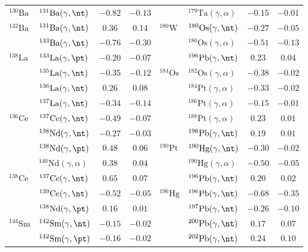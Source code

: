 {\begin{longtable}{llcc llcc}
$^{130}\mathrm{Ba}$ & $^{131}\mathrm{Ba}(\gamma,\nt)$ & $-0.82$ & $-0.13$ & $ $ & $^{179}\mathrm{Ta}(\gamma,\alpha)$ & $-0.15$ & $-0.01$ \\ 
$^{132}\mathrm{Ba}$ & $^{131}\mathrm{Ba}(\gamma,\nt)$ & $0.36$ & $0.14$ & $^{180}\mathrm{W}$ & $^{180}\mathrm{Os}(\gamma,\nt)$ & $-0.27$ & $-0.05$ \\ 
$ $ & $^{133}\mathrm{Ba}(\gamma,\nt)$ & $-0.76$ & $-0.30$ & $ $ & $^{180}\mathrm{Os}(\gamma,\alpha)$ & $-0.51$ & $-0.13$ \\ 
$^{138}\mathrm{La}$ & $^{133}\mathrm{La}(\gamma,\pt)$ & $-0.20$ & $-0.07$ & $ $ & $^{196}\mathrm{Pb}(\gamma,\nt)$ & $0.23$ & $0.04$ \\ 
$ $ & $^{135}\mathrm{La}(\gamma,\nt)$ & $-0.35$ & $-0.12$ & $^{184}\mathrm{Os}$ & $^{182}\mathrm{Os}(\gamma,\alpha)$ & $-0.38$ & $-0.02$ \\ 
$ $ & $^{136}\mathrm{La}(\gamma,\nt)$ & $0.26$ & $0.08$ & $ $ & $^{184}\mathrm{Pt}(\gamma,\alpha)$ & $-0.33$ & $-0.02$ \\ 
$ $ & $^{137}\mathrm{La}(\gamma,\nt)$ & $-0.34$ & $-0.14$ & $ $ & $^{186}\mathrm{Pt}(\gamma,\alpha)$ & $-0.15$ & $-0.01$ \\ 
$^{136}\mathrm{Ce}$ & $^{137}\mathrm{Ce}(\gamma,\nt)$ & $-0.49$ & $-0.07$ & $ $ & $^{188}\mathrm{Pt}(\gamma,\alpha)$ & $0.23$ & $0.01$ \\ 
$ $ & $^{138}\mathrm{Nd}(\gamma,\nt)$ & $-0.27$ & $-0.03$ & $ $ & $^{196}\mathrm{Pb}(\gamma,\nt)$ & $0.19$ & $0.01$ \\ 
$ $ & $^{138}\mathrm{Nd}(\gamma,\pt)$ & $0.48$ & $0.06$ & $^{190}\mathrm{Pt}$ & $^{190}\mathrm{Hg}(\gamma,\nt)$ & $-0.30$ & $-0.02$ \\ 
$ $ & $^{140}\mathrm{Nd}(\gamma,\alpha)$ & $0.38$ & $0.04$ & $ $ & $^{190}\mathrm{Hg}(\gamma,\alpha)$ & $-0.50$ & $-0.05$ \\ 
$^{138}\mathrm{Ce}$ & $^{137}\mathrm{Ce}(\gamma,\nt)$ & $0.65$ & $0.07$ & $ $ & $^{196}\mathrm{Pb}(\gamma,\nt)$ & $0.20$ & $0.02$ \\ 
$ $ & $^{139}\mathrm{Ce}(\gamma,\nt)$ & $-0.52$ & $-0.05$ & $^{196}\mathrm{Hg}$ & $^{196}\mathrm{Pb}(\gamma,\nt)$ & $-0.68$ & $-0.35$ \\ 
$ $ & $^{138}\mathrm{Nd}(\gamma,\pt)$ & $0.16$ & $0.01$ & $ $ & $^{197}\mathrm{Pb}(\gamma,\nt)$ & $-0.26$ & $-0.10$ \\ 
$^{144}\mathrm{Sm}$ & $^{142}\mathrm{Sm}(\gamma,\nt)$ & $-0.15$ & $-0.02$ & $ $ & $^{200}\mathrm{Pb}(\gamma,\nt)$ & $0.17$ & $0.07$ \\ 
$ $ & $^{142}\mathrm{Sm}(\gamma,\pt)$ & $-0.16$ & $-0.02$ & $ $ & $^{202}\mathrm{Pb}(\gamma,\nt)$ & $0.24$ & $0.10$ \\ 

\end{longtable}}
